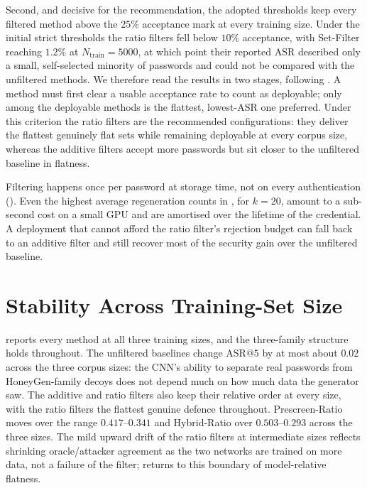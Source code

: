 Second, and decisive for the recommendation, the adopted thresholds keep
every filtered method above the $25\%$ acceptance mark at every training
size. Under the initial strict thresholds the ratio filters fell below
$10\%$ acceptance, with Set-Filter reaching $1.2\%$ at
$N_{\text{train}} = 5000$, at which point their reported $\mathrm{ASR}$
described only a small, self-selected minority of passwords and could
not be compared with the unfiltered methods. We therefore read the
results in two stages, following . A
method must first clear a usable acceptance rate to count as deployable;
only among the deployable methods is the flattest,
lowest-$\mathrm{ASR}$ one preferred. Under this criterion the ratio
filters are the recommended configurations: they deliver the flattest
genuinely flat sets while remaining deployable at every corpus size,
whereas the additive filters accept more passwords but sit closer to the
unfiltered baseline in flatness.

Filtering happens once per password at storage time, not on every
authentication (). Even the highest average
regeneration counts in , for $k = 20$, amount to a
sub-second cost on a small GPU and are amortised over the lifetime of
the credential. A deployment that cannot afford the ratio filter's
rejection budget can fall back to an additive filter and still recover
most of the security gain over the unfiltered baseline.

\section{Stability Across Training-Set Size}
\label{sec:results-ntrain}

 reports every method at all three training sizes,
and the three-family structure holds throughout. The unfiltered
baselines change $\mathrm{ASR}@5$ by at most about $0.02$ across the
three corpus sizes: the CNN's ability to separate real passwords from
HoneyGen-family decoys does not depend much on how much data the
generator saw. The additive and ratio filters also keep their relative
order at every size, with the ratio filters the flattest genuine defence
throughout. Prescreen-Ratio moves over the range $0.417$--$0.341$ and
Hybrid-Ratio over $0.503$--$0.293$ across the three sizes. The mild
upward drift of the ratio filters at intermediate sizes reflects
shrinking oracle/attacker agreement as the two networks are trained on
more data, not a failure of the filter;  returns to
this boundary of model-relative flatness.

